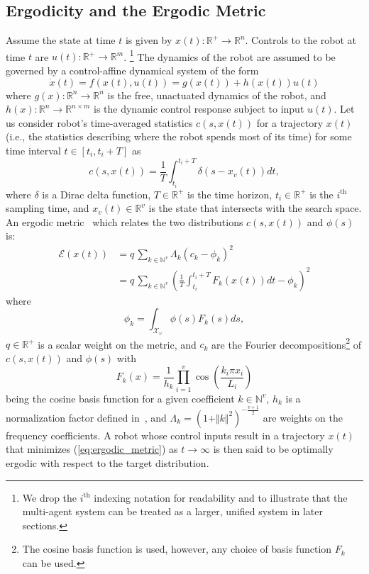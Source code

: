 \documentclass[letterpaper, 10 pt, conference]{ieeeconf}  %
\begin{document}
\subsection{Ergodicity and the Ergodic Metric}
\label{subsec:ergodicity-and-the-ergodic-metric}
Assume the state at time $t$ is given by $x(t) : \mathbb{R}^+ \to \mathbb{R}^n$. 
Controls to the robot at time $t$ are $u(t) : \mathbb{R}^+ \to \mathbb{R}^m$. \footnote{We drop the $i^\text{th}$ indexing notation for readability and to illustrate that the multi-agent system can be treated as a larger, unified system in later sections.}
The dynamics of the robot are assumed to be governed by a control-affine dynamical system of the form
\begin{equation} \label{eq:robot_dynamics}
\dot{x}(t) = f(x(t),u(t)) = g(x(t)) + h(x(t)) u(t)
\end{equation}
where $g(x) : \mathbb{R}^n \to \mathbb{R}^n$ is the free, unactuated dynamics of the robot, and $h(x): \mathbb{R}^n \to \mathbb{R}^{n \times m}$ is the dynamic control response subject to input $u(t)$.
Let us consider robot's time-averaged statistics $c(s, x(t))$ for a trajectory $x(t)$ (i.e., the statistics describing where the robot spends most of its time) for some time interval $t \in \left[ t_i, t_i + T\right]$ as
\begin{equation}\label{eq:time_avg_stats}
c(s, x(t)) = \frac{1}{T}\int_{t_i}^{t_i+T} \delta (s - x_v(t)) dt,
\end{equation}
where $\delta$ is a Dirac delta function, $T \in \mathbb{R}^+$ is the time horizon, $t_i \in \mathbb{R}^+$ is the $i^\text{th}$ sampling time, and $x_v(t) \in \mathbb{R}^v$ is the state that intersects with the search space.
An ergodic metric~\cite{mathew2011metrics} which relates the two distributions $c(s,x(t))$ and $\phi(s)$ is:
\begin{align} \label{eq:ergodic_metric}
\mathcal{E}(x(t)) & = q \,\sum_{k \in \mathbb{N}^v} \Lambda_k \left(c_k -\phi_k \right)^2   \\
& = q \, \sum_{k \in \mathbb{N}^v} \left( \frac{1}{T} \int_{t_i}^{t_i + T} F_k(x(t)) dt - \phi_k \right)^2 \nonumber
\end{align}
where
\begin{equation*}
\phi_k =  \int_{\mathcal{X}_v} \phi(s) F_k(s) ds, 
\end{equation*} 
$q \in \mathbb{R}^+$ is a scalar weight on the metric, and $c_k$ are the Fourier decompositions\footnote{The cosine basis function is used, however, any choice of basis function $F_k$ can be used.} of $c(s,x(t))$ and $\phi(s)$ with
\begin{equation*}
F_k(x) = \frac{1}{h_k}\prod_{i=1}^v \cos \left( \frac{k_i \pi x_i}{L_i} \right)
\end{equation*}
being the cosine basis function for a given coefficient $k \in \mathbb{N}^v$,  $h_k$ is a normalization factor defined in~\cite{mathew2011metrics}, and $\Lambda_k = (1 + \Vert k \Vert^2)^{-\frac{v+1}{2}}$ are weights on the frequency coefficients.
A robot whose control inputs result in a trajectory $x(t)$ that minimizes (\ref{eq:ergodic_metric}) as $t\to \infty$ is then said to be optimally ergodic with respect to the target distribution.
\end{document}
